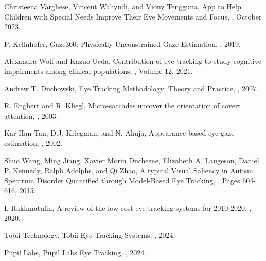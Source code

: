 \documentclass[10pt,a4paper,twoside]{article}
\begin{document}
\begin{thebibliography}{*}
Christeena Varghese, Vincent Wahyudi, and Viony Tengguna,
\newblock App to Help Children with Special Needs Improve Their Eye Movements and Focus,
, October 2023.
\vspace{-7pt}

P. Kellnhofer,
\newblock Gaze360: Physically Unconstrained Gaze Estimation,
, 2019.
\vspace{-7pt}

Alexandra Wolf and Kazuo Ueda,
\newblock Contribution of eye-tracking to study cognitive impairments among clinical populations,
, Volume 12, 2021.
\vspace{-7pt}

Andrew T. Duchowski,
\newblock Eye Tracking Methodology: Theory and Practice, , 2007.
\vspace{-7pt}

R. Engbert and R. Kliegl,
\newblock Micro-saccades uncover the orientation of covert attention,
, 2003.
\vspace{-7pt}

Kar-Han Tan, D.J. Kriegman, and N. Ahuja,
\newblock Appearance-based eye gaze estimation,
, 2002.
\vspace{-7pt}

Shuo Wang, Ming Jiang, Xavier Morin Duchesne, Elizabeth A. Laugeson, Daniel P. Kennedy, Ralph Adolphs, and Qi Zhao,
\newblock A typical Visual Saliency in Autism Spectrum Disorder Quantified through Model-Based Eye Tracking,
, Pages 604-616, 2015.
\vspace{-7pt}

I. Rakhmatulin,
\newblock A review of the low-cost eye-tracking systems for 2010-2020,
, 2020.
\vspace{-7pt}

Tobii Technology,
\newblock Tobii Eye Tracking Systems,
, 2024.
\vspace{-7pt}

Pupil Labs,
\newblock Pupil Labs Eye Tracking,
, 2024.
\vspace{-7pt}


\end{thebibliography}
\end{document}
